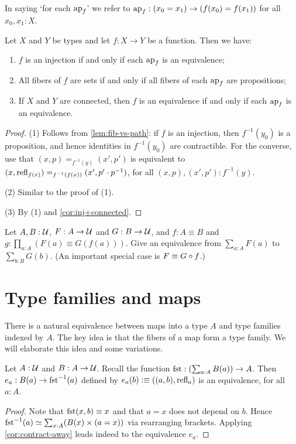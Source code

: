 \begin{definition}
In saying `for each $\ap{f}$' we refer to
$\ap{f}: (x_0=x_1) \to (f(x_0)=f(x_1))$ for all $x_0,x_1:X$.

\begin{corollary}\label{cor:fib-vs-path}
Let $X$ and $Y$ be types and let $f:X\to Y$ be a function. Then we have:
\begin{enumerate}
\item\label{prop-fib-vs-path} 
$f$ is an injection if and only if each $\ap{f}$ is an equivalence;
\item\label{set-fib-vs-path} 
All fibers of $f$ are sets if and only if all fibers of each $\ap{f}$ are propositions;
\item\label{conn-fib-vs-path} 
If $X$ and $Y$ are connected, then $f$ is an equivalence 
if and only if each $\ap{f}$ is an equivalence.
\end{enumerate}
\end{corollary}
\begin{proof}
(1) Follows from \cref{lem:fib-vs-path}: if $f$ is an injection,
then $f^{-1}(y_0)$ is a proposition, and hence identities in $f^{-1}(y_0)$
are contractible. For the converse, use that $(x,p)=_{f^{-1}(y)}(x',p')$ is
equivalent to $(x,\refl{f(x)}) =_{f^{-1}(f(x))} (x',p'\cdot p^{-1})$, 
for all $(x,p),(x',p') : f^{-1}(y)$.

(2) Similar to the proof of (1).

(3) By (1) and \cref{cor:inj+connected}.
\end{proof}

\begin{xca}\label{xca:sum-equivalences}
Let $A,B:{\mathcal{U}}$, $F:A\to{\mathcal{U}}$ and $G:B\to{\mathcal{U}}$,
and $f: A\equiv B$ and $g:\prod_{a:A}(F(a) \equiv G(f(a)))$.
Give an equivalence from $\sum_{a:A} F(a)$ to $\sum_{b:B} G(b)$.
(An important special case is $F\jdeq G\circ f$.) 
\end{xca}

\section{Type families and maps}
\label{sec:typefam}

There is a natural equivalence between maps into a type $A$
and type families indexed by $A$. The key idea is that the
fibers of a map form a type family. We will elaborate this
idea and some variations.


\begin{lemma}\label{lem:fst-fiber(a)=B(a)}
Let $A:{\mathcal{U}}$ and $B:A\to{\mathcal{U}}$.
Recall the function $\fst: (\sum_{a:A} B(a))\to A$.
Then $e_a: B(a) \to \fst^{-1}(a)$ defined by 
$e_a(b)\defeq ((a,b),\refl{a})$ is an equivalence,
for all $a:A$.
\end{lemma}
\begin{proof}
Note that $\fst(x,b)\jdeq x$ and that $a=x$ does
not depend on $b$. Hence
$\fst^{-1}(a) \equiv \sum_{x:A}  (B(x) \times (a=x))$
via rearranging brackets.
Applying \cref{cor:contract-away} leads indeed to 
the equivalence $e_a$. 
\end{proof}


\end{definition}
